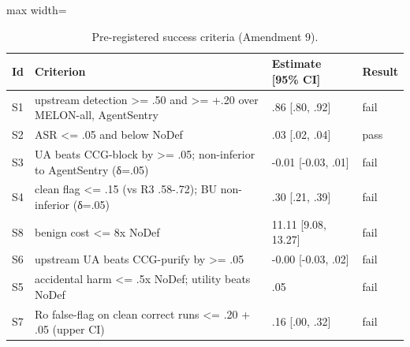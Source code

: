 \begin{table}[t]
\centering
\caption{Pre-registered success criteria (Amendment 9).}
\label{tab:ccg-criteria}
\scriptsize
\setlength{\tabcolsep}{2.5pt}
\begin{adjustbox}{max width=\linewidth}
\begin{tabular}{llll}
\toprule
Id & Criterion & Estimate [95\% CI] & Result \\
\midrule
S1 & upstream detection >= .50 and >= +.20 over MELON-all, AgentSentry & .86 [.80, .92] & fail \\
S2 & ASR <= .05 and below NoDef & .03 [.02, .04] & pass \\
S3 & UA beats CCG-block by >= .05; non-inferior to AgentSentry (δ=.05) & -0.01 [-0.03, .01] & fail \\
S4 & clean flag <= .15 (vs R3 .58-.72); BU non-inferior (δ=.05) & .30 [.21, .39] & fail \\
S8 & benign cost <= 8x NoDef & 11.11 [9.08, 13.27] & fail \\
S6 & upstream UA beats CCG-purify by >= .05 & -0.00 [-0.03, .02] & fail \\
S5 & accidental harm <= .5x NoDef; utility beats NoDef & .05 & fail \\
S7 & Ro false-flag on clean correct runs <= .20 + .05 (upper CI) & .16 [.00, .32] & fail \\
\bottomrule
\end{tabular}
\end{adjustbox}
\end{table}
